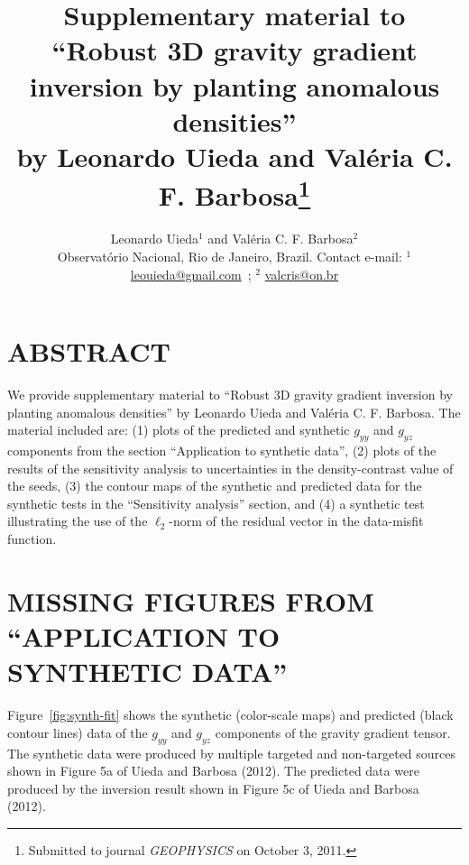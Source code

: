 \documentclass[twocolumn]{article}
\begin{document}
\title{\textbf{\Large
Supplementary material to\\[0.15cm]
``Robust 3D gravity gradient inversion by planting anomalous densities''\\
by Leonardo Uieda and Val\'eria C. F. Barbosa}\footnote{Submitted to journal
\textit{GEOPHYSICS} on October 3, 2011.}}
\author{Leonardo Uieda$^{1}$ and Val\'eria C. F. Barbosa$^{2}$\\[0.2cm]
    {\small
    Observat\'orio Nacional, Rio de Janeiro, Brazil.
    Contact e-mail: 
    $^{1}$ \href{mailto:leouieda@gmail.com}{leouieda@gmail.com}~;
    $^{2}$ \href{mailto:valcris@on.br}{valcris@on.br}}}

\maketitle

\section*{\normalsize\center ABSTRACT}
We provide supplementary material to
``Robust 3D gravity gradient inversion by planting anomalous densities''
by Leonardo Uieda and Val\'eria C. F. Barbosa.
The material included are:
(1) plots of the predicted and synthetic $g_{yy}$ and $g_{yz}$ components
from the section ``Application to synthetic data'',
(2) plots of the results of the sensitivity analysis to
uncertainties in the density-contrast value of the seeds,
(3) the contour maps of the synthetic and predicted data
for the synthetic tests in the ``Sensitivity analysis'' section,
and
(4) a synthetic test illustrating the use of
the $\ell_{2}$-norm of the residual vector
in the data-misfit function.


\vspace{-0.7cm}
\section*{\normalsize\center MISSING FIGURES FROM ``APPLICATION TO SYNTHETIC DATA''}

Figure~\ref{fig:synth-fit} shows
the synthetic (color-scale maps) and predicted (black contour lines) data of the
$g_{yy}$ and $g_{yz}$ components of the gravity gradient tensor.
The synthetic data were produced
by multiple targeted and non-targeted sources
shown in Figure 5a of Uieda and Barbosa (2012).
The predicted data were produced by
the inversion result shown in
Figure 5c of Uieda and Barbosa (2012).
\end{document}
